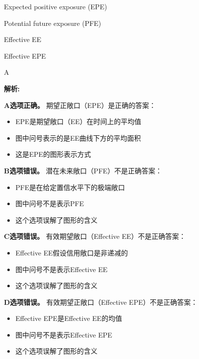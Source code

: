 \documentclass{article}
\newenvironment{explanation}
{\textbf{解析:}\par}
{\par}
\begin{document}
\begin{choices}
    \item Expected positive exposure (EPE)
    \item Potential future exposure (PFE)
    \item Effective EE
    \item Effective EPE
\end{choices}

\begin{correctanswer}
    A
\end{correctanswer}

\begin{explanation}
    \textbf{A选项正确。}
    期望正敞口（EPE）是正确的答案：
    \begin{itemize}
        \item EPE是期望敞口（EE）在时间上的平均值
        \item 图中问号表示的是EE曲线下方的平均面积
        \item 这是EPE的图形表示方式
    \end{itemize}

    \textbf{B选项错误。}
    潜在未来敞口（PFE）不是正确答案：
    \begin{itemize}
        \item PFE是在给定置信水平下的极端敞口
        \item 图中问号不是表示PFE
        \item 这个选项误解了图形的含义
    \end{itemize}

    \textbf{C选项错误。}
    有效期望敞口（Effective EE）不是正确答案：
    \begin{itemize}
        \item Effective EE假设信用敞口是非递减的
        \item 图中问号不是表示Effective EE
        \item 这个选项误解了图形的含义
    \end{itemize}

    \textbf{D选项错误。}
    有效期望正敞口（Effective EPE）不是正确答案：
    \begin{itemize}
        \item Effective EPE是Effective EE的均值
        \item 图中问号不是表示Effective EPE
        \item 这个选项误解了图形的含义
    \end{itemize}
\end{explanation}
\end{document}
